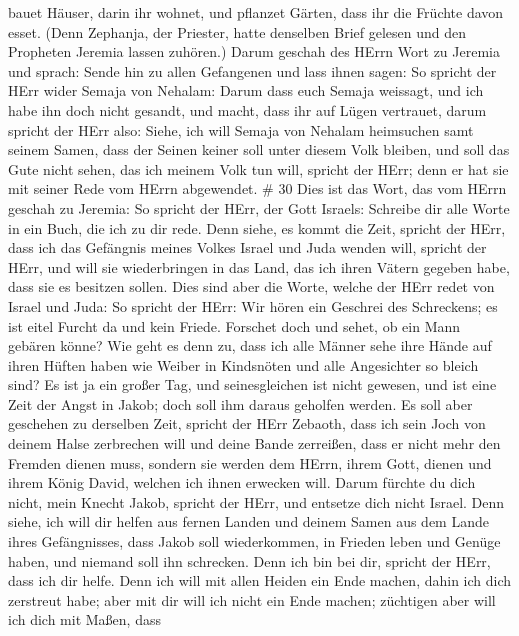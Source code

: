 bauet Häuser, darin ihr wohnet, und pflanzet Gärten, dass ihr die
Früchte davon esset.  (Denn Zephanja, der Priester, hatte
denselben Brief gelesen und den Propheten Jeremia lassen zuhören.)
 Darum geschah des HErrn Wort zu Jeremia und sprach:
 Sende hin zu allen Gefangenen und lass ihnen sagen: So
spricht der HErr wider Semaja von Nehalam: Darum dass euch Semaja
weissagt, und ich habe ihn doch nicht gesandt, und macht, dass ihr auf
Lügen vertrauet,  darum spricht der HErr also: Siehe, ich
will Semaja von Nehalam heimsuchen samt seinem Samen, dass der Seinen
keiner soll unter diesem Volk bleiben, und soll das Gute nicht sehen,
das ich meinem Volk tun will, spricht der HErr; denn er hat sie mit
seiner Rede vom HErrn abgewendet. \# 30  Dies ist das Wort,
das vom HErrn geschah zu Jeremia:  So spricht der HErr, der
Gott Israels: Schreibe dir alle Worte in ein Buch, die ich zu dir rede.
 Denn siehe, es kommt die Zeit, spricht der HErr, dass ich
das Gefängnis meines Volkes Israel und Juda wenden will, spricht der
HErr, und will sie wiederbringen in das Land, das ich ihren Vätern
gegeben habe, dass sie es besitzen sollen.  Dies sind aber
die Worte, welche der HErr redet von Israel und Juda:  So
spricht der HErr: Wir hören ein Geschrei des Schreckens; es ist eitel
Furcht da und kein Friede.  Forschet doch und sehet, ob ein
Mann gebären könne? Wie geht es denn zu, dass ich alle Männer sehe ihre
Hände auf ihren Hüften haben wie Weiber in Kindsnöten und alle
Angesichter so bleich sind?  Es ist ja ein großer Tag, und
seinesgleichen ist nicht gewesen, und ist eine Zeit der Angst in Jakob;
doch soll ihm daraus geholfen werden.  Es soll aber
geschehen zu derselben Zeit, spricht der HErr Zebaoth, dass ich sein
Joch von deinem Halse zerbrechen will und deine Bande zerreißen, dass er
nicht mehr den Fremden dienen muss,  sondern sie werden dem
HErrn, ihrem Gott, dienen und ihrem König David, welchen ich ihnen
erwecken will.  Darum fürchte du dich nicht, mein Knecht
Jakob, spricht der HErr, und entsetze dich nicht Israel. Denn siehe, ich
will dir helfen aus fernen Landen und deinem Samen aus dem Lande ihres
Gefängnisses, dass Jakob soll wiederkommen, in Frieden leben und Genüge
haben, und niemand soll ihn schrecken.  Denn ich bin bei
dir, spricht der HErr, dass ich dir helfe. Denn ich will mit allen
Heiden ein Ende machen, dahin ich dich zerstreut habe; aber mit dir will
ich nicht ein Ende machen; züchtigen aber will ich dich mit Maßen, dass
